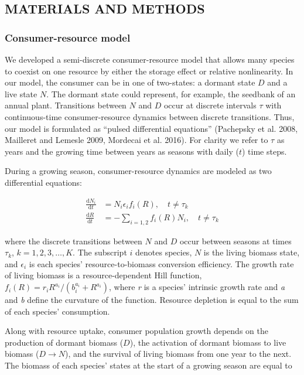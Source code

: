 \documentclass[12pt,]{article}
\begin{document}
\subsection{MATERIALS AND METHODS}\label{materials-and-methods}

\subsubsection{Consumer-resource model}\label{consumer-resource-model}

We developed a semi-discrete consumer-resource model that allows many
species to coexist on one resource by either the storage effect or
relative nonlinearity. In our model, the consumer can be in one of
two-states: a dormant state \(D\) and a live state \(N\). The dormant
state could represent, for example, the seedbank of an annual plant.
Transitions between \(N\) and \(D\) occur at discrete intervals \(\tau\)
with continuous-time consumer-resource dynamics between discrete
transitions. Thus, our model is formulated as ``pulsed differential
equations'' (Pachepsky et al. 2008, Mailleret and Lemesle 2009, Mordecai
et al. 2016). For clarity we refer to \(\tau\) as years and the growing
time between years as seasons with daily (\(t\)) time steps.

During a growing season, consumer-resource dynamics are modeled as two
differential equations:

\begin{align}
\frac{\text{d}N_{i}}{\text{d}t} &= N_{i}\epsilon_if_{i}(R), \quad t \ne \tau_k\\
\frac{\text{d}R}{\text{d}t} &= - \sum\limits_{i=1,2}f_{i}(R)N_{i}, \quad t \ne \tau_k
\end{align}

\noindent where the discrete transitions between \(N\) and \(D\) occur
between seasons at times \(\tau_k\), \(k = 1,2,3, \dots, K\). The
subscript \(i\) denotes species, \(N\) is the living biomass state, and
\(\epsilon_i\) is each species' resource-to-biomass conversion
efficiency. The growth rate of living biomass is a resource-dependent
Hill function,
\(f_{i}(R) = r_{i}R^{a_{i}} / (b_{i}^{a_{i}}+R^{a_{i}})\), where
\emph{r} is a species' intrinsic growth rate and \emph{a} and \emph{b}
define the curvature of the function. Resource depletion is equal to the
sum of each species' consumption.

Along with resource uptake, consumer population growth depends on the
production of dormant biomass (\(D\)), the activation of dormant biomass
to live biomass (\(D \rightarrow N\)), and the survival of living
biomass from one year to the next. The biomass of each species' states
at the start of a growing season are equal to
\end{document}
